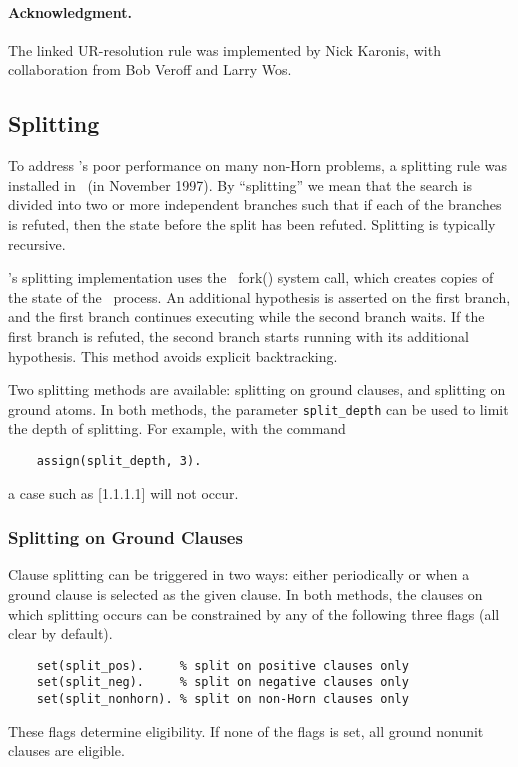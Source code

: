 \documentclass[11pt]{article}
\begin{document}
\paragraph{Acknowledgment.}
The linked UR-resolution rule was implemented by Nick Karonis,
with collaboration from Bob Veroff and Larry Wos.

\subsection{Splitting}

To address \otter's poor performance on many non-Horn
problems, a splitting rule was installed in \otter\ (in November 1997).
By ``splitting'' we mean that the search is divided into
two or more independent branches such that if each of the branches
is refuted, then the state before the split has been refuted.
Splitting is typically recursive.

\otter's splitting implementation uses the \unix\ fork() system
call, which creates copies of the state of the \otter\ process.
An additional hypothesis is asserted on the first branch,
and the first branch continues executing while the second branch
waits.  If the first branch is refuted, the second branch starts
running with its additional hypothesis.
This method avoids explicit backtracking.

Two splitting methods are available: splitting on ground clauses,
and splitting on ground atoms.  In both methods, the parameter
\verb:split_depth: can be used to limit the depth of splitting.
For example, with the command

{\small
\begin{verbatim}
    assign(split_depth, 3).
\end{verbatim}
}
\noindent
a case such as [1.1.1.1] will not occur.

\subsubsection{Splitting on Ground Clauses}

Clause splitting can be triggered in two ways: either periodically
or when a ground clause is selected as the given clause.
In both methods, the clauses on which splitting occurs can
be constrained by any of the following three flags (all clear by default).

{\small
\begin{verbatim}
    set(split_pos).     % split on positive clauses only
    set(split_neg).     % split on negative clauses only
    set(split_nonhorn). % split on non-Horn clauses only
\end{verbatim}
}
\noindent
These flags determine eligibility.
If none of the flags is set, all ground nonunit clauses are eligible.
\end{document}
